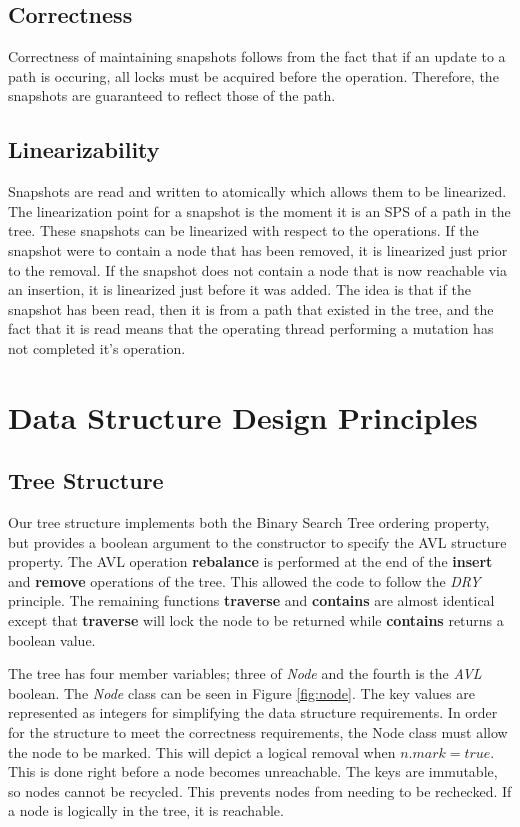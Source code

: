 \documentclass[11pt]{article}
\theoremstyle{definition}
\theoremstyle{theorem}
\begin{document}
\subsection{Correctness}
Correctness of maintaining snapshots follows from the fact that if an update to a path is occuring, all locks must be acquired before the operation. Therefore, the snapshots are guaranteed to reflect those of the path. 
\subsection{Linearizability}
Snapshots are read and written to atomically which allows them to be linearized. The linearization point for a snapshot is the moment it is an SPS of a path in the tree. These snapshots can be linearized with respect to the operations. If the snapshot were to contain a node that has been removed, it is linearized just prior to the removal. If the snapshot does not contain a node that is now reachable via an insertion, it is linearized just before it was added. The idea is that if the snapshot has been read, then it is from a path that existed in the tree, and the fact that it is read means that the operating thread performing a mutation has not completed it's operation. 
\section{Data Structure Design Principles}
\subsection{Tree Structure}
Our tree structure implements both the Binary Search Tree ordering property, but provides a boolean argument to the constructor to specify the AVL structure property. The AVL operation \textbf{rebalance} is performed at the end of the \textbf{insert} and \textbf{remove} operations of the tree. This allowed the code to follow the \textit{DRY} principle. The remaining functions \textbf{traverse} and \textbf{contains} are almost identical except that \textbf{traverse} will lock the node to be returned while \textbf{contains} returns a boolean value.

The tree has four member variables; three of \textit{Node} and the fourth is the \textit{AVL} boolean. The \textit{Node} class can be seen in Figure \ref{fig:node}. The key values are represented as integers for simplifying the data structure requirements. In order for the structure to meet the correctness requirements, the Node class must allow the node to be marked. This will depict a logical removal when $n.mark = true$. This is done right before a node becomes unreachable. The keys are immutable, so nodes cannot be recycled. This prevents nodes from needing to be rechecked. If a node is logically in the tree, it is reachable. 
\end{document}
